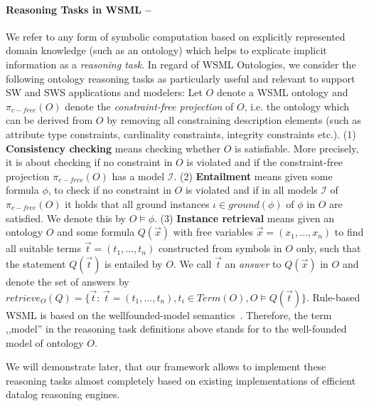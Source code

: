 \paragraph{\small Reasoning Tasks in WSML --}
We refer to any form of symbolic computation based on explicitly
represented domain knowledge (such as an ontology) which helps
to explicate implicit information as a \emph{reasoning task}.
In regard of WSML Ontologies, we consider the following
ontology reasoning tasks as particularly useful and relevant to support SW and SWS applications and
modelers:
Let $O$ denote a WSML ontology and $\pi_{c-free}(O)$ denote the \emph{constraint-free projection} of $O$, i.e. the
ontology which can be derived from $O$ by removing all constraining description
elements (such as attribute type constraints, cardinality constraints, integrity constraints etc.).
(1) {\bf Consistency checking} means checking whether $O$ is satisfiable. More precisely, it is about checking
if no constraint in $O$ is violated and if the constraint-free projection $\pi_{c-free}(O)$ has a model $\mathcal{I}$.
(2) {\bf Entailment} means given some formula $\phi$,
to check if no constraint in $O$ is violated and if in all models $\mathcal{I}$ of $\pi_{c-free}(O)$ it holds that all ground instances
$\iota \in ground(\phi)$ of $\phi$ in $O$ are satisfied. We denote
this by $O \models \phi$.
(3) {\bf Instance retrieval} means given an ontology $O$ and some formula $Q(\vec{x})$
with free variables $\vec{x} = (x_1,\ldots,x_n)$ to find all suitable
terms $\vec{t} = (t_1,\ldots,t_n)$ constructed from symbols in $O$ only,
such that the statement $Q(\vec{t})$ is entailed by $O$.
We call $\vec{t}$ an \emph{answer} to $Q(\vec{x})$ in $O$ and denote
the set of answers by $retrieve_O(Q) = \{\vec{t} : \, \vec{t} = (t_1, \ldots, t_n), t_i \in Term(O), O \models
Q(\vec{t})\}$. Rule-based WSML is based on the wellfounded-model
semantics~\cite{Gelder+RossETAL-WellSemaGeneLogi:91}. Therefore, the term ,,model'' in the reasoning task definitions above stands for to the well-founded model of ontology
$O$.



We will demonstrate later, that our framework allows to implement
these reasoning tasks almost completely based on existing
implementations of efficient datalog reasoning engines.
